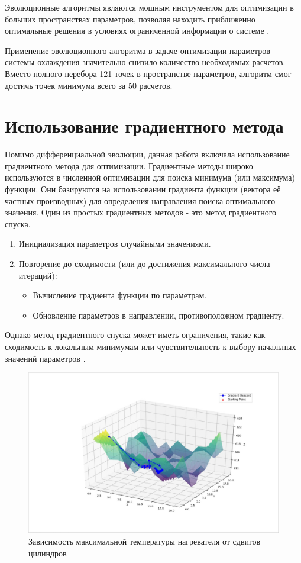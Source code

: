 \documentclass[a4paper,12pt]{article}
\theoremstyle{plain} %
\theoremstyle{definition} %
\theoremstyle{remark} %
\begin{document}
Эволюционные алгоритмы являются мощным инструментом для оптимизации в больших пространствах параметров, позволяя находить приближенно оптимальные решения в условиях ограниченной информации о системе \cite{evolution}.

Применение эволюционного алгоритма в задаче оптимизации параметров системы охлаждения значительно снизило количество необходимых расчетов. Вместо полного перебора 121 точек в пространстве параметров, алгоритм смог достичь точек минимума всего за 50 расчетов.

\section{Использование градиентного метода}

Помимо дифференциальной эволюции, данная работа включала использование градиентного метода для оптимизации. Градиентные методы широко используются в численной оптимизации для поиска минимума (или максимума) функции. Они базируются на использовании градиента функции (вектора её частных производных) для определения направления поиска оптимального значения. Один из простых градиентных методов - это метод градиентного спуска.

\begin{enumerate}
	\item Инициализация параметров случайными значениями.
	\item Повторение до сходимости (или до достижения максимального числа итераций):
	      \begin{itemize}
		      \item Вычисление градиента функции по параметрам.
		      \item Обновление параметров в направлении, противоположном градиенту.
	      \end{itemize}
\end{enumerate}

Однако метод градиентного спуска может иметь ограничения, такие как сходимость к локальным минимумам или чувствительность к выбору начальных значений параметров \cite{Chernyshev2007}.

\begin{figure}[h]
	\begin{center}
		\includegraphics[width=0.4\linewidth]{images/24.jpg}
		\caption{Зависимость максимальной температуры нагревателя от сдвигов цилиндров} %
	\end{center}
\end{figure}
\end{document}
